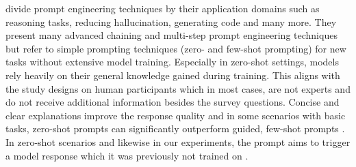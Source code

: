 \par \textcite{sahoo2024systematic} divide prompt engineering techniques by their application domains such as reasoning tasks, reducing hallucination, generating code and many more. They present many advanced chaining and multi-step prompt engineering techniques but refer to simple prompting techniques (zero- and few-shot prompting) for new tasks without extensive model training. Especially in zero-shot settings, models rely heavily on their general knowledge gained during training. This aligns with the study designs on human participants which in most cases, are not experts and do not receive additional information besides the survey questions. Concise and clear explanations improve the response quality and in some scenarios with basic tasks, zero-shot prompts can significantly outperform guided, few-shot prompts \parencite{chen2023unleashing,ekin2023prompt}. In zero-shot scenarios and likewise in our experiments, the prompt aims to trigger a model response which it was previously not trained on \parencite{marvin2023prompt}.

